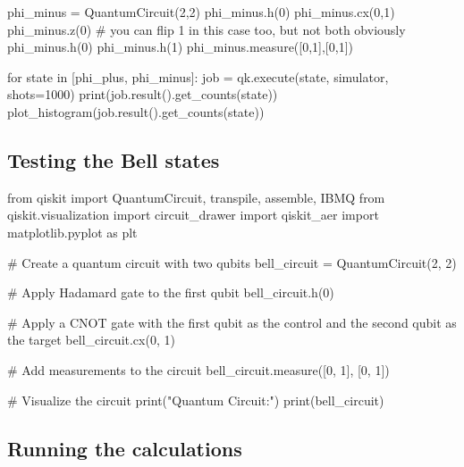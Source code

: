 \documentclass[%
oneside,                 %
final,                   %
10pt]{article}
\begin{document}
phi_minus = QuantumCircuit(2,2)
phi_minus.h(0)
phi_minus.cx(0,1)
phi_minus.z(0) # you can flip 1 in this case too, but not both obviously
phi_minus.h(0)
phi_minus.h(1)
phi_minus.measure([0,1],[0,1])

for state in [phi_plus, phi_minus]:
    job = qk.execute(state, simulator, shots=1000)
    print(job.result().get_counts(state))
    plot_histogram(job.result().get_counts(state))

\epycod


\subsection{Testing the Bell states}





















\bpycod
from qiskit import QuantumCircuit, transpile, assemble, IBMQ
from qiskit.visualization import circuit_drawer
import qiskit_aer
import matplotlib.pyplot as plt

# Create a quantum circuit with two qubits
bell_circuit = QuantumCircuit(2, 2)

# Apply Hadamard gate to the first qubit
bell_circuit.h(0)

# Apply a CNOT gate with the first qubit as the control and the second qubit as the target
bell_circuit.cx(0, 1)

# Add measurements to the circuit
bell_circuit.measure([0, 1], [0, 1])

# Visualize the circuit
print("Quantum Circuit:")
print(bell_circuit)

\epycod


\subsection{Running the calculations}
\end{document}
